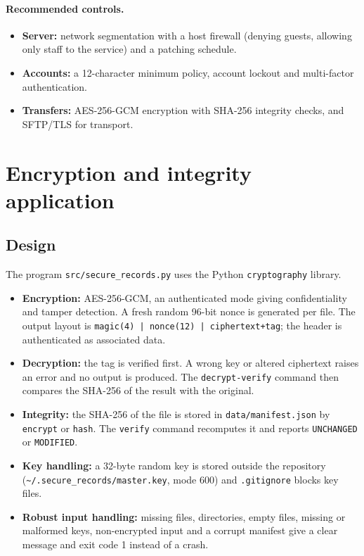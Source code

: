 \documentclass[11pt,a4paper]{article}
\begin{document}
\paragraph{Recommended controls.}
\begin{itemize}[nosep]
\item \textbf{Server:} network segmentation with a host firewall (denying guests, allowing only staff to the service) and a patching schedule.
\item \textbf{Accounts:} a 12-character minimum policy, account lockout and multi-factor authentication.
\item \textbf{Transfers:} AES-256-GCM encryption with SHA-256 integrity checks, and SFTP/TLS for transport.
\end{itemize}

\section{Encryption and integrity application}
\subsection{Design}
The program \texttt{src/secure\_records.py} uses the Python \texttt{cryptography} library.
\begin{itemize}[nosep]
\item \textbf{Encryption:} AES-256-GCM, an authenticated mode giving confidentiality and tamper detection. A fresh random 96-bit nonce is generated per file. The output layout is \texttt{magic(4) | nonce(12) | ciphertext+tag}; the header is authenticated as associated data.
\item \textbf{Decryption:} the tag is verified first. A wrong key or altered ciphertext raises an error and no output is produced. The \texttt{decrypt-verify} command then compares the SHA-256 of the result with the original.
\item \textbf{Integrity:} the SHA-256 of the file is stored in \texttt{data/manifest.json} by \texttt{encrypt} or \texttt{hash}. The \texttt{verify} command recomputes it and reports \texttt{UNCHANGED} or \texttt{MODIFIED}.
\item \textbf{Key handling:} a 32-byte random key is stored outside the repository (\verb|~/.secure_records/master.key|, mode 600) and \texttt{.gitignore} blocks key files.
\item \textbf{Robust input handling:} missing files, directories, empty files, missing or malformed keys, non-encrypted input and a corrupt manifest give a clear message and exit code 1 instead of a crash.
\end{itemize}
\end{document}
